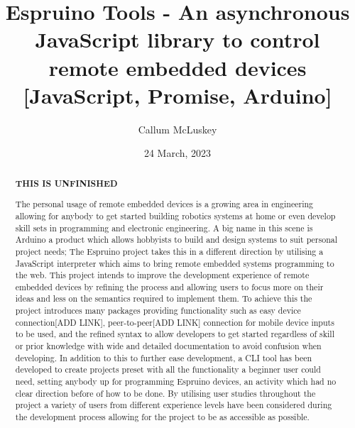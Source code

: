 \documentclass{l4proj}
\begin{document}
\title{Espruino Tools - An asynchronous JavaScript library to control remote embedded devices [JavaScript, Promise, Arduino]}
\author{Callum McLuskey}
\date{24 March, 2023}

\maketitle

\begin{abstract}
    \textbf{THIS IS UNFINISHED}

    The personal usage of remote embedded devices is a growing area in engineering allowing for anybody to get started building robotics systems at home or even develop skill sets in programming and electronic engineering. A big name in this scene is Arduino a product which allows hobbyists to build and design systems to suit personal project needs; The Espruino project takes this in a different direction by utilising a JavaScript interpreter which aims to bring remote embedded systems programming to the web. This project intends to improve the development experience of remote embedded devices by refining the process and allowing users to focus more on their ideas and less on the semantics required to implement them. To achieve this the project introduces many packages providing functionality such as easy device connection[ADD LINK], peer-to-peer[ADD LINK] connection for mobile device inputs to be used, and the refined syntax to allow developers to get started regardless of skill or prior knowledge with wide and detailed documentation to avoid confusion when developing. In addition to this to further ease development, a CLI tool has been developed to create projects preset with all the functionality a beginner user could need, setting anybody up for programming Espruino devices, an activity which had no clear direction before of how to be done. By utilising user studies throughout the project a variety of users from different experience levels have been considered during the development process allowing for the project to be as accessible as possible.

\end{abstract}

\def\consentname {Callum McLuskey} %
\def\consentdate {23 March 2023} %
\end{document}
